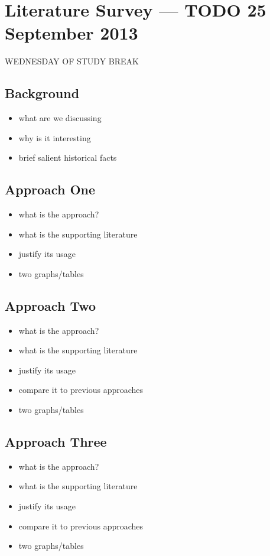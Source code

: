\section{Literature Survey --- TODO 25 September 2013}

WEDNESDAY OF STUDY BREAK

\subsection{Background}

\begin{itemize}
  \item what are we discussing
  \item why is it interesting
  \item brief salient historical facts
\end{itemize}

\subsection{Approach One}

\begin{itemize}
  \item what is the approach?
  \item what is the supporting literature
  \item justify its usage
  \item two graphs/tables
\end{itemize}

\subsection{Approach Two}

\begin{itemize}
  \item what is the approach?
  \item what is the supporting literature
  \item justify its usage
  \item compare it to previous approaches
  \item two graphs/tables
\end{itemize}

\subsection{Approach Three}

\begin{itemize}
  \item what is the approach?
  \item what is the supporting literature
  \item justify its usage
  \item compare it to previous approaches
  \item two graphs/tables
\end{itemize}

